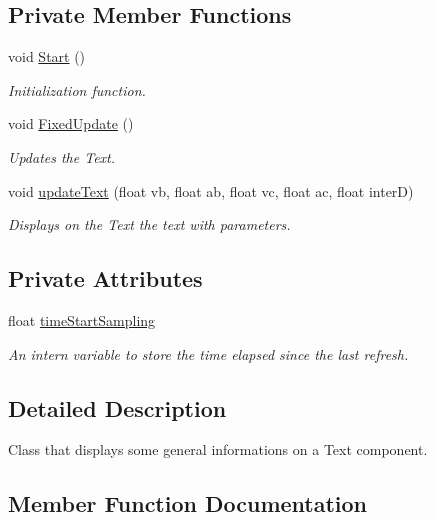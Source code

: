 \subsection*{Private Member Functions}
\begin{DoxyCompactItemize}
\item 
void \hyperlink{classinformations_adbca1b4eb5f7fc762725261b2469ee62}{Start} ()
\begin{DoxyCompactList}\small\item\em Initialization function. \end{DoxyCompactList}\item 
void \hyperlink{classinformations_a352b4a3e1670fd6c324ffe5659b76c5c}{Fixed\+Update} ()
\begin{DoxyCompactList}\small\item\em Updates the Text. \end{DoxyCompactList}\item 
void \hyperlink{classinformations_a6cbc72bf9a7cccdc906bc6ec0b0b870c}{update\+Text} (float vb, float ab, float vc, float ac, float interD)
\begin{DoxyCompactList}\small\item\em Displays on the Text the text with parameters. \end{DoxyCompactList}\end{DoxyCompactItemize}
\subsection*{Private Attributes}
\begin{DoxyCompactItemize}
\item 
float \hyperlink{classinformations_aab8401586ee1d9d587cdf9cf07611dbd}{time\+Start\+Sampling}
\begin{DoxyCompactList}\small\item\em An intern variable to store the time elapsed since the last refresh.\end{DoxyCompactList}\end{DoxyCompactItemize}


\subsection{Detailed Description}
Class that displays some general informations on a Text component. 



\subsection{Member Function Documentation}
\mbox{\label{classinformations_a352b4a3e1670fd6c324ffe5659b76c5c}} 
